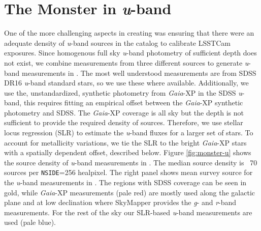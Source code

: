 \section{The Monster in \textit{u}-band}
\label{sec:monster-u}
One of the more challenging aspects in creating \monster was ensuring that there were an adequate density of \textit{u}-band sources in the catalog to calibrate LSSTCam exposures. 
Since homogenous full sky \textit{u}-band photometry of sufficient depth does not exist, we combine measurements from three different sources to generate \textit{u}-band measurements in \monster. 
The most well understood measurements are from SDSS DR16 \textit{u}-band standard stars, so we use these where available. 
Additionally, we use the, unstandardized, synthetic photometry from \emph{Gaia}-XP in the SDSS \textit{u}-band, this requires fitting an empirical offset between the \emph{Gaia}-XP synthetic photometry and SDSS.
The  \emph{Gaia}-XP coverage is all sky but the depth is not sufficient to provide the required density of sources.
Therefore, we use stellar locus regression (SLR) to estimate the \textit{u}-band fluxes for a larger set of stars.
To account for metallicity variations, we tie the SLR to the bright \emph{Gaia}-XP stars with a spatially dependent offset, described below.
Figure \ref{fig:monster-u} shows the source density of \textit{u}-band measurements in \monster. The median source density is ~70 sources per \texttt{NSIDE}=256 healpixel. 
The right panel shows mean survey source for the \textit{u}-band measurements in \monster. 
The regions with SDSS coverage can be seen in gold, while \textit{Gaia}-XP measurements (pale red) are mostly used along the galactic plane and at low declination where SkyMapper provides the \emph{g}- and \emph{r}-band measurements. 
For the rest of the sky our SLR-based \textit{u}-band measurements are used (pale blue).

